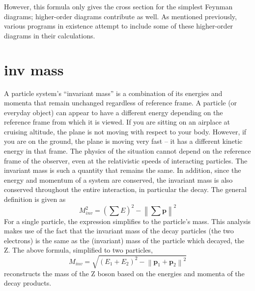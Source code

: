 


However, this formula only gives the cross section 
for the simplest Feynman diagrams; 
higher-order diagrams contribute as well.  
As mentioned previously, various programs 
in existence attempt to include some of these higher-order 
diagrams in their calculations.  


\section{inv mass}
A particle system's ``invariant mass'' is 
a combination of its energies and momenta that 
remain unchanged regardless of reference frame.  
A particle (or everyday object) can appear to 
have a different energy depending on the reference 
frame from which it is viewed.  
If you are sitting on an airplace at cruising altitude, 
the plane is not moving with respect to your body.  
However, if you are on the ground, the plane is 
moving very fast -- 
it has a different kinetic energy in that frame.  
The physics of the situation cannot depend on 
the reference frame of the observer, 
even at the relativistic speeds of interacting particles.  
The invariant mass is such a quantity that 
remains the same.  
In addition, since the energy and momentum 
of a system are conserved, 
the invariant mass is also conserved 
throughout the entire interaction, 
in particular the decay.  
The general definition is given as 
\[
M_{inv}^2 = \left( \sum E \right)^2 - \left\| \sum \mathbf{p} \right\|^2
\]
For a single particle, the expression simplifies 
to the particle's mass.  
This analysis makes use of the fact that the 
invariant mass of the decay particles 
(the two electrons) 
is the same as the (invariant) mass of the 
particle which decayed, the Z.  
The above formula, simplified to two particles, 
\[
M_{inv} = \sqrt{ \left(E_1 + E_2\right)^2 - \left\|\mathbf{p}_1 + \mathbf{p}_2\right\|^2 }
\]
reconstructs the mass of the Z boson 
based on the energies and momenta 
of the decay products.  


